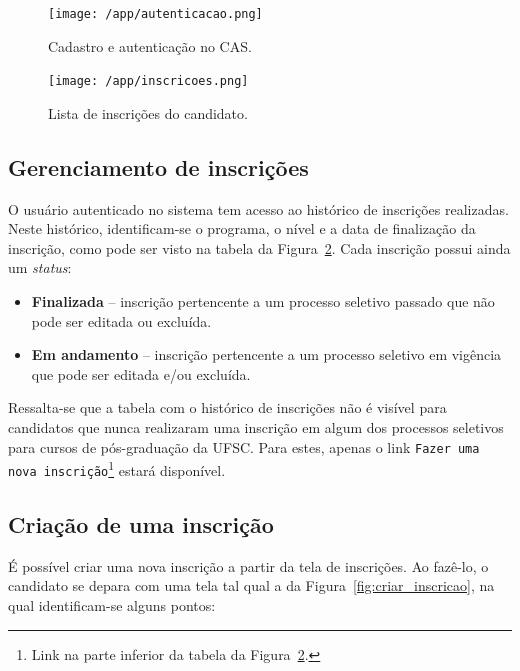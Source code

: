 \documentclass[
  10.5pt,				  %
	openright,			%
	twoside,			  %
  a5paper,
  chapter=TITLE,	%
	section=TITLE,	%
  hyphens,        %
	english,        %
	brazil          %
]{abntex2}
\begin{document}
\begin{figure}[!ht]
  \caption{\label{fig:autenticacao} Cadastro e autenticação no CAS. }
  \begin{center}
    \texttt{[image: /app/autenticacao.png]}
  \end{center}
\end{figure}


\begin{figure}[!ht]
  \caption{\label{fig:inscricoes} Lista de inscrições do candidato.}
  \begin{center}
    \texttt{[image: /app/inscricoes.png]}
  \end{center}
\end{figure}

\subsection{Gerenciamento de inscrições}\label{sec:gerenciamento_inscricoes}

O usuário autenticado no sistema tem acesso ao histórico de inscrições realizadas. Neste histórico, identificam-se o programa, o nível e a data de finalização da inscrição, como pode ser visto na tabela da Figura~\ref{fig:inscricoes}. Cada inscrição possui ainda um \emph{status}: 

\begin{itemize}
  \item \textbf{Finalizada} -- inscrição pertencente a um processo seletivo passado que não pode ser editada ou excluída.
  \item \textbf{Em andamento} -- inscrição pertencente a um processo seletivo em vigência que pode ser editada e/ou excluída.
\end{itemize}

Ressalta-se que a tabela com o histórico de inscrições não é visível para candidatos que nunca realizaram uma inscrição em algum dos processos seletivos para cursos de pós-graduação da UFSC. Para estes, apenas o link \texttt{Fazer uma nova inscrição}\footnote{Link na parte inferior da tabela da Figura~\ref{fig:inscricoes}.} estará disponível.


\subsection{Criação de uma inscrição}\label{sec:criacao_inscricao}

É possível criar uma nova inscrição a partir da tela de inscrições. Ao fazê-lo, o candidato se depara com uma tela tal qual a da Figura~\ref{fig:criar_inscricao}, na qual identificam-se alguns pontos:
\end{document}
